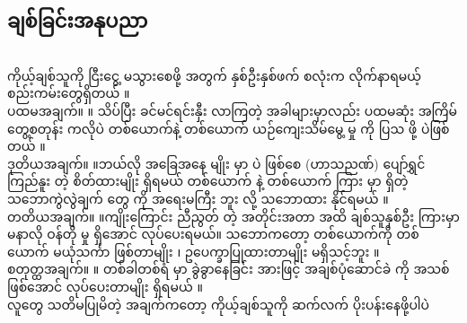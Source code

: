 \documentclass[conference]{IEEEtran}
\begin{document}
\subsection {\padauktext ချစ်ခြင်းအနုပညာ}\leavevmode\\
{\padauktext 
ကိုယ့်ချစ်သူကို ငြီးငွေ့ မသွားစေဖို့ အတွက် နှစ်ဦးနှစ်ဖက် စလုံးက လိုက်နာရမယ့် စည်းကမ်းတွေရှိတယ် ။\leavevmode\\
ပထမအချက်။ ။ သိပ်ပြီး ခင်မင်ရင်းနှီး လာကြတဲ့ အခါများမှာလည်း ပထမဆုံး အကြိမ် တွေ့စတုန်း ကလိုပဲ တစ်ယောက်နဲ့ တစ်ယောက် ယဉ်ကျေးသိမ်မွေ့ မှု ကို ပြသ ဖို့ ပဲဖြစ်တယ် ။\leavevmode\\
ဒုတိယအချက်။ ။ဘယ်လို အခြေအနေ မျိုး မှာ ပဲ ဖြစ်စေ (ဟာသညဏ်) ပျော်ရွှင်ကြည်နူး တဲ့ စိတ်ထားမျိုး ရှိရမယ် တစ်ယောက် နဲ့ တစ်ယောက် ကြား မှာ ရှိတဲ့ သဘောကွဲလွဲချက် တွေ ကို အရေးမကြီး ဘူး လို့ သဘောထား နိုင်ရမယ် ။\leavevmode\\
တတိယအချက်။ ။ကျိုးကြောင်း ညီညွတ် တဲ့ အတိုင်းအတာ အထိ ချစ်သူနှစ်ဦး ကြားမှာ မနာလို ဝန်တို မှု ရှိအောင် လုပ်ပေးရမယ်။ သဘောကတော့ တစ်ယောက်ကို တစ်ယောက် မယုံသင်္ကာ ဖြစ်တာမျိုး ၊ ဥပေက္ခာပြုထားတာမျိုး မရှိသင့်ဘူး ။\leavevmode\\
စတုတ္ထအချက်။ ။ တစ်ခါတစ်ရံ မှာ ခွဲခွာနေခြင်း အားဖြင့် အချစ်ပုံဆောင်ခဲ ကို အသစ်ဖြစ်အောင် လုပ်ပေးတာမျိုး ရှိရမယ် ။\leavevmode\\
လူတွေ သတိမပြုမိတဲ့ အချက်ကတော့ ကိုယ့်ချစ်သူကို ဆက်လက် ပိုးပန်းနေဖို့ပါပဲ }\leavevmode\\
\end{document}
